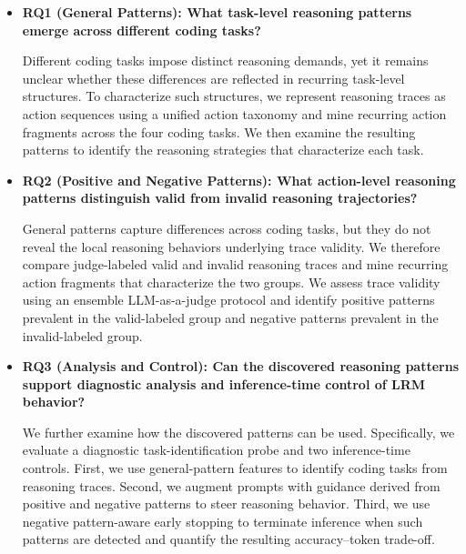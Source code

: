 \documentclass[acmsmall,screen,review,anonymous]{acmart}
\begin{document}
\begin{itemize}[itemsep=1.5mm]

\item \textbf{RQ1 (General Patterns): What task-level reasoning patterns emerge across different coding tasks?}

Different coding tasks impose distinct reasoning demands, yet it remains unclear whether these differences are reflected in recurring task-level structures. To characterize such structures, we represent reasoning traces as action sequences using a unified action taxonomy and mine recurring action fragments across the four coding tasks. We then examine the resulting patterns to identify the reasoning strategies that characterize each task.

\item \textbf{RQ2 (Positive and Negative Patterns): What action-level reasoning patterns distinguish valid from invalid reasoning trajectories?}

General patterns capture differences across coding tasks, but they do not reveal the local reasoning behaviors underlying trace validity. We therefore compare judge-labeled valid and invalid reasoning traces and mine recurring action fragments that characterize the two groups. We assess trace validity using an ensemble LLM-as-a-judge protocol and identify positive patterns prevalent in the valid-labeled group and negative patterns prevalent in the invalid-labeled group.

\item \textbf{RQ3 (Analysis and Control): Can the discovered reasoning patterns support diagnostic analysis and inference-time control of LRM behavior?}

We further examine how the discovered patterns can be used. Specifically, we evaluate a diagnostic task-identification probe and two inference-time controls. First, we use general-pattern features to identify coding tasks from reasoning traces. Second, we augment prompts with guidance derived from positive and negative patterns to steer reasoning behavior. Third, we use negative pattern-aware early stopping to terminate inference when such patterns are detected and quantify the resulting accuracy--token trade-off.

\end{itemize}
\end{document}
